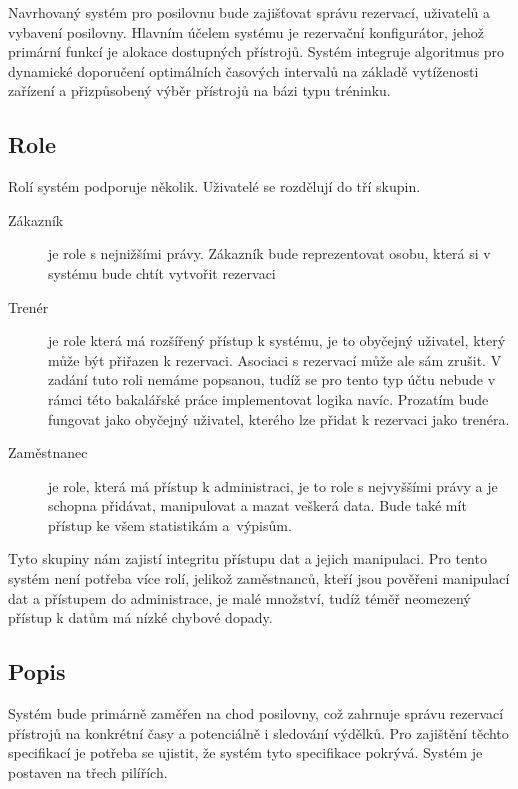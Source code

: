 Navrhovaný systém pro posilovnu bude zajišťovat správu rezervací, uživatelů a vybavení posilovny. Hlavním účelem systému je rezervační konfigurátor, jehož primární funkcí je alokace dostupných přístrojů. Systém integruje algoritmus pro dynamické doporučení optimálních časových intervalů na základě vytíženosti zařízení a přizpůsobený výběr přístrojů na bázi typu tréninku.

\subsection{Role}
Rolí systém podporuje několik. Uživatelé se rozdělují do tří skupin.

\begin{description}
    \item[Zákazník] je role s nejnižšími právy. Zákazník bude reprezentovat osobu, která si v systému bude chtít vytvořit rezervaci
    \item[Trenér] je role která má rozšířený přístup k systému, je to obyčejný uživatel, který může být přiřazen k rezervaci. Asociaci s rezervací může ale sám zrušit. V zadání tuto roli nemáme popsanou, tudíž se pro tento typ účtu nebude v rámci této bakalářské práce implementovat logika navíc. Prozatím bude fungovat jako obyčejný uživatel, kterého lze přidat k rezervaci jako trenéra.
    \item[Zaměstnanec] je role, která má přístup k administraci, je to role s nejvyššími právy a je schopna přidávat, manipulovat a mazat veškerá data. Bude také mít přístup ke všem statistikám a~výpisům.
\end{description}
Tyto skupiny nám zajistí integritu přístupu dat a jejich manipulaci. Pro tento systém není potřeba více rolí, jelikož zaměstnanců, kteří jsou pověřeni manipulací dat a přístupem do administrace, je malé množství, tudíž téměř neomezený přístup k datům má nízké chybové dopady.

\subsection{Popis}
Systém bude primárně zaměřen na chod posilovny, což zahrnuje správu rezervací přístrojů na konkrétní časy a potenciálně i sledování výdělků. Pro zajištění těchto specifikací je potřeba se ujistit, že systém tyto specifikace pokrývá. Systém je postaven na třech pilířích.

